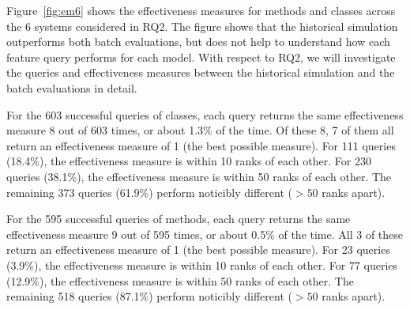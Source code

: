 Figure~\ref{fig:em6} shows the effectiveness measures for methods and classes
across the 6 systems considered in RQ2. The figure shows that the historical
simulation outperforms both batch evaluations, but does not help to understand
how each feature query performs for each model.  With respect to RQ2, we will
investigate the queries and effectiveness measures between the historical
simulation and the batch evaluations in detail.

For the 603 successful queries of classes,
each query returns the same effectiveness measure 8 out of 603 times, or about 1.3\% of the time.
Of these 8, 7 of them all return an effectiveness measure of 1 (the best possible measure).
For 111 queries (18.4\%), the effectiveness measure is within 10 ranks of each other.
For 230 queries (38.1\%), the effectiveness measure is within 50 ranks of each other.
The remaining 373 queries (61.9\%) perform noticibly different ($> 50$ ranks apart).

For the 595 successful queries of methods,
each query returns the same effectiveness measure 9 out of 595 times, or about 0.5\% of the time.
All 3 of these return an effectiveness measure of 1 (the best possible measure).
For 23 queries (3.9\%), the effectiveness measure is within 10 ranks of each other.
For 77 queries (12.9\%), the effectiveness measure is within 50 ranks of each other.
The remaining 518 queries (87.1\%) perform noticibly different ($> 50$ ranks apart).

